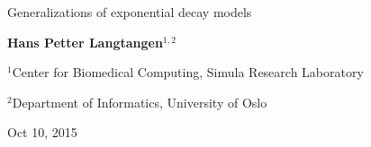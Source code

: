 \documentclass[%
oneside,                 %
final,                   %
10pt]{article}
\begin{document}







\thispagestyle{empty}

\begin{center}
{\LARGE\bf
\begin{spacing}{1.25}
Generalizations of exponential decay models
\end{spacing}
}
\end{center}


\begin{center}
{\bf Hans Petter Langtangen${}^{1, 2}$} \\ [0mm]
\end{center}

\begin{center}
\centerline{{\small ${}^1$Center for Biomedical Computing, Simula Research Laboratory}}
\centerline{{\small ${}^2$Department of Informatics, University of Oslo}}
\end{center}
    

\begin{center}
Oct 10, 2015
\end{center}

\vspace{1cm}


\tableofcontents

\clearpage %
\end{document}
